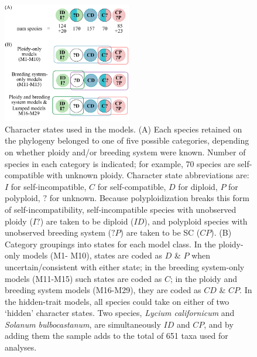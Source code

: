 \begin{figure}
\centering
\includegraphics[width=0.5\textwidth]{states.pdf}
\caption{
Character states used in the models.
(A) Each species retained on the phylogeny belonged to one of five possible categories, depending on whether ploidy and/or breeding system were known. 
Number of species in each category is indicated; for example, 70 species are self-compatible with unknown ploidy.
Character state abbreviations are: $I$ for self-incompatible, $C$ for self-compatible, $D$ for diploid, $P$ for polyploid, $?$ for unknown.
Because polyploidization breaks this form of self-incompatibility, self-incompatible species with unobserved ploidy ($I?$) are taken to be diploid ($ID$), and polyploid species with unobserved breeding system ($?P$) are taken to be SC ($CP$).
(B) Category groupings into states for each model class.
In the ploidy-only models (M1- M10), states are coded as $D$ \& $P$ when uncertain/consistent with either state; in the breeding system-only models (M11-M15) such states are coded as $C$; in the ploidy and breeding system models (M16-M29), they are coded as $CD$ \& $CP$.
In the hidden-trait models, all species could take on either of two `hidden' character states. %
Two species, \emph{Lycium californicum} and \emph{Solanum bulbocastanum}, are simultaneously $ID$ and $CP$, and by adding them the sample adds to the total of 651 taxa used for analyses.
}
\label{figure:stateclassifications}
\end{figure}

\begin{suppfigure}
    \caption{ All models.  [This figure is provided as a separate, large-format page.] }
    \label{fig:allmodels}
\end{suppfigure}



